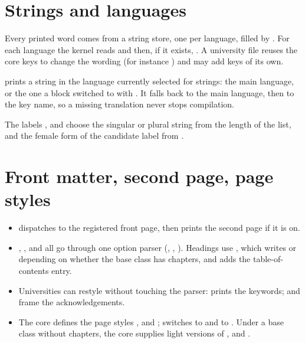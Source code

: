 \section{Strings and languages}

Every printed word comes from a string store, one per language, filled by
. For each language the
kernel reads  and then, if it exists,
. A university file reuses the core
keys to change the wording (for instance ) and may add
keys of its own.

 prints a string in the language currently
selected for strings: the main language, or the one a block switched to
with . It falls back to the main language, then to the key
name, so a missing translation never stops compilation.

The labels ,  and 
choose the singular or plural string from the length of the list, and the
female form of the candidate label from .

\section{Front matter, second page, page styles}

\begin{itemize}
  \item {} dispatches to the registered front page, then
    prints the second page if it is on.
  \item {}, , 
    and  all go through one option parser (,
    , ). Headings use ,
    which writes  or  depending on whether the
    base class has chapters, and adds the table-of-contents entry.
  \item Universities can restyle without touching the parser:
     prints the keywords;
     and
     frame the acknowledgements.
  \item The core defines the page styles , 
    and ;  switches to  and
     to . Under a base class without chapters,
    the core supplies light versions of , 
    and .
\end{itemize}

